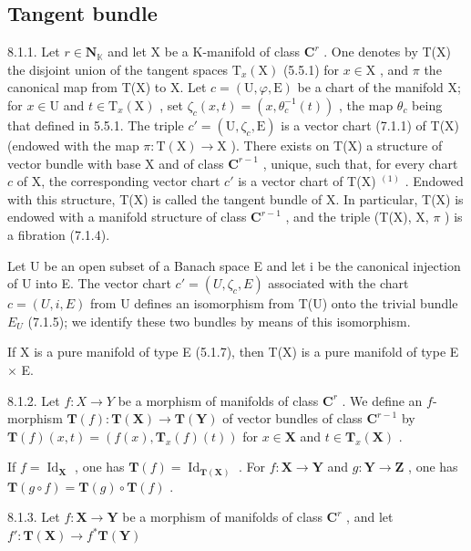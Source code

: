 \subsection{Tangent bundle}

8.1.1. Let \(r \in \mathbf{N}_{\mathbb{K}}\) and let X be a K-manifold of class \(\mathbf{C}^r\) . One denotes by T(X) the disjoint union of the tangent spaces \(\mathrm{T}_x(\mathrm{X})\) (5.5.1) for \(x \in \mathrm{X}\) , and \(\pi\) the canonical map from T(X) to X. Let \(c = (\mathrm{U}, \varphi, \mathrm{E})\) be a chart of the manifold X; for \(x \in \mathrm{U}\) and \(t \in \mathrm{T}_x(\mathrm{X})\) , set \(\zeta_c(x, t) = (x, \theta_c^{-1}(t))\) , the map \(\theta_c\) being that defined in 5.5.1. The triple \(c' = (\mathrm{U}, \zeta_c, \mathrm{E})\) is a vector chart (7.1.1) of T(X) (endowed with the map \(\pi: \mathrm{T}(\mathrm{X}) \to \mathrm{X}\) ). There exists on T(X) a structure of vector bundle with base X and of class \(\mathbf{C}^{r-1}\) , unique, such that, for every chart \(c\) of X, the corresponding vector chart \(c'\) is a vector chart of T(X) \(^{(1)}\) . Endowed with this structure, T(X) is called the tangent bundle of X. In particular, T(X) is endowed with a manifold structure of class \(\mathbf{C}^{r-1}\) , and the triple (T(X), X, \(\pi\) ) is a fibration (7.1.4).

Let U be an open subset of a Banach space E and let i be the canonical injection of U into E. The vector chart \(c' = (U, \zeta_c, E)\) associated with the chart \(c = (U, i, E)\) from U defines an isomorphism from T(U) onto the trivial bundle \(E_U\) (7.1.5); we identify these two bundles by means of this isomorphism.

If X is a pure manifold of type E (5.1.7), then T(X) is a pure manifold of type E \(\times\) E.

8.1.2. Let \(f: X \to Y\) be a morphism of manifolds of class \(\mathbf{C}^r\) . We define an \(f\)-morphism \(\mathbf{T}(f): \mathbf{T}(\mathbf{X}) \to \mathbf{T}(\mathbf{Y})\) of vector bundles of class \(\mathbf{C}^{r-1}\) by \(\mathbf{T}(f)(x, t) = (f(x), \mathbf{T}_x(f)(t))\) for \(x \in \mathbf{X}\) and \(t \in \mathbf{T}_x(\mathbf{X})\) .

If \(f = \operatorname{Id}_{\mathbf{X}}\) , one has \(\mathbf{T}(f) = \operatorname{Id}_{\mathbf{T}(\mathbf{X})}\) . For \(f: \mathbf{X} \to \mathbf{Y}\) and \(g: \mathbf{Y} \to \mathbf{Z}\) , one has \(\mathbf{T}(g \circ f) = \mathbf{T}(g) \circ \mathbf{T}(f)\) .

8.1.3. Let \(f: \mathbf{X} \to \mathbf{Y}\) be a morphism of manifolds of class \(\mathbf{C}^r\) , and let \(f': \mathbf{T}(\mathbf{X}) \to f^* \mathbf{T}(\mathbf{Y})\)

